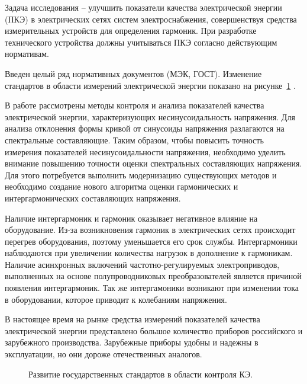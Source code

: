 Задача исследования -- улучшить показатели качества электрической энергии (ПКЭ) в электрических сетях систем электроснабжения, совершенствуя средства измерительных устройств для определения гармоник. При разработке технического устройства должны учитываться ПКЭ  согласно действующим нормативам. 

Введен целый ряд нормативных документов (МЭК, ГОСТ). Изменение стандартов в области измерений электрической энергии показано на рисунке~\ref{img:picture1} \cite{GOST30804.4.30-2013, GOST30804.4.7-2013, GOST32144-2013, GOST_R8.655-2009, GOSTR51317.4.15-2012, GOST33073-2014, GOST8.622-2013}. 

В работе рассмотрены методы контроля и анализа показателей качества электрической энергии, характеризующих несинусоидальность напряжения. Для анализа отклонения формы кривой от синусоиды напряжения разлагаются на спектральные составляющие. Таким образом, чтобы повысить точность измерения показателей несинусоидальности напряжения, необходимо уделить внимание повышению точности оценки спектральных составляющих напряжения. Для этого потребуется выполнить модернизацию существующих методов и необходимо создание нового алгоритма оценки гармонических и интергармонических составляющих напряжения. 


Наличие интергармоник и гармоник оказывает негативное влияние на оборудование. Из-за возникновения гармоник в электрических сетях происходит перегрев оборудования, поэтому уменьшается его срок службы. Интергармоники наблюдаются при увеличении количества нагрузок в дополнение к гармоникам. Наличие асинхронных включений частотно-регулируемых электроприводов, выполненных на основе полупроводниковых преобразователей является причиной появления интергармоник. Так же интергамоники возникают при изменении тока в оборудовании, которое приводит к колебаниям напряжения. 

В настоящее время на рынке средства измерений показателей качества электрической энергии представлено большое количество приборов российского и зарубежного производства. Зарубежные приборы удобны и надежны в эксплуатации, но они дороже отечественных аналогов.

\begin{figure}[ht]
	\caption{Развитие государственных стандартов в области контроля КЭ.}\label{img:picture1}
\end{figure}


